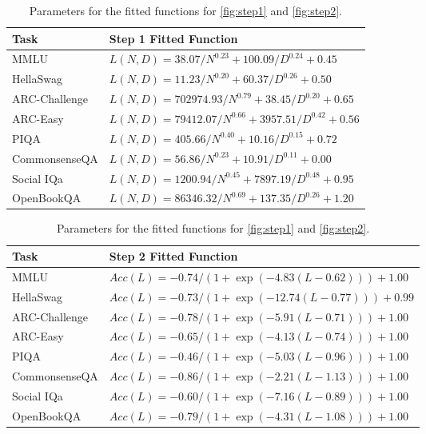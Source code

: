 \begin{table}[t]
\small
\setlength{\tabcolsep}{3pt}
\centering
\begin{tabular}{l l}
\toprule
\textbf{Task} & \textbf{Step 1 Fitted Function} \\
\midrule
MMLU & $L(N, D) = 38.07 / N^{0.23} + 100.09 / D^{0.24} + 0.45$ \\
HellaSwag & $L(N, D) = 11.23 / N^{0.20} + 60.37 / D^{0.26} + 0.50$ \\
ARC-Challenge & $L(N, D) = 702974.93 / N^{0.79} + 38.45 / D^{0.20} + 0.65$ \\
ARC-Easy & $L(N, D) = 79412.07 / N^{0.66} + 3957.51 / D^{0.42} + 0.56$ \\
PIQA & $L(N, D) = 405.66 / N^{0.40} + 10.16 / D^{0.15} + 0.72$ \\
CommonsenseQA & $L(N, D) = 56.86 / N^{0.23} + 10.91 / D^{0.11} + 0.00$ \\
Social IQa & $L(N, D) = 1200.94 / N^{0.45} + 7897.19 / D^{0.48} + 0.95$ \\
OpenBookQA & $L(N, D) = 86346.32 / N^{0.69} + 137.35 / D^{0.26} + 1.20$ \\
\bottomrule
\end{tabular}

\vspace{1em}

\begin{tabular}{l l}
\toprule
\textbf{Task} & \textbf{Step 2 Fitted Function} \\
\midrule
MMLU & $Acc(L) = -0.74 / (1 + \exp (-4.83(L - 0.62))) + 1.00$ \\
HellaSwag & $Acc(L) = -0.73 / (1 + \exp (-12.74(L - 0.77))) + 0.99$ \\
ARC-Challenge & $Acc(L) = -0.78 / (1 + \exp (-5.91(L - 0.71))) + 1.00$ \\
ARC-Easy & $Acc(L) = -0.65 / (1 + \exp (-4.13(L - 0.74))) + 1.00$ \\
PIQA & $Acc(L) = -0.46 / (1 + \exp (-5.03(L - 0.96))) + 1.00$ \\
CommonsenseQA & $Acc(L) = -0.86 / (1 + \exp (-2.21(L - 1.13))) + 1.00$ \\
Social IQa & $Acc(L) = -0.60 / (1 + \exp (-7.16(L - 0.89))) + 1.00$ \\
OpenBookQA & $Acc(L) = -0.79 / (1 + \exp (-4.31(L - 1.08))) + 1.00$ \\\bottomrule
\end{tabular}
\caption{
    Parameters for the fitted functions for \autoref{fig:step1} and \autoref{fig:step2}.
}
\label{tab:fitted_params}
\end{table}
